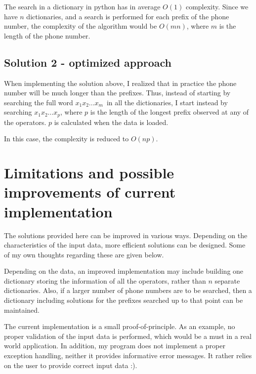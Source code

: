 \documentclass[12pt]{article}
\begin{document}
\vspace{0.2cm}

The search in a dictionary in python has in average $O(1)$
complexity. Since we have $n$ dictionaries, and a search is performed
for each prefix of the phone number, the complexity of the algorithm
would be $O(mn)$, where $m$ is the length of the phone number.

\subsection{Solution 2 - optimized approach}
When implementing the solution above, I realized that in practice the
phone number will be much longer than the prefixes. Thus, instead of
starting by searching the full word $x_1x_2 ... x_m$ in all the
dictionaries, I start instead by searching $x_1x_2 ...x_p$, where $p$
is the length of the longest prefix observed at any of the
operators. $p$ is calculated when the data is loaded.

\vspace{0.2cm}

In this case, the complexity is reduced to $O(np)$. 


\section{Limitations and possible improvements of current implementation}
The solutions provided here can be improved in various ways. Depending
on the characteristics of the input data, more efficient solutions can
be designed. Some of my own thoughts regarding these are given below.

\vspace{0.2cm}

Depending on the data, an improved implementation may include building
one dictionary storing the information of all the operators, rather
than $n$ separate dictionaries. Also, if a larger number of phone
numbers are to be searched, then a dictionary including solutions for
the prefixes searched up to that point can be maintained. 

\vspace{0.2cm}

The current implementation is a small proof-of-principle. As an
example, no proper validation of the input data is performed, which
would be a must in a real world application. In addition, my program
does not implement a proper exception handling, neither it provides
informative error messages. It rather relies on the user to provide
correct input data :).
\end{document}
